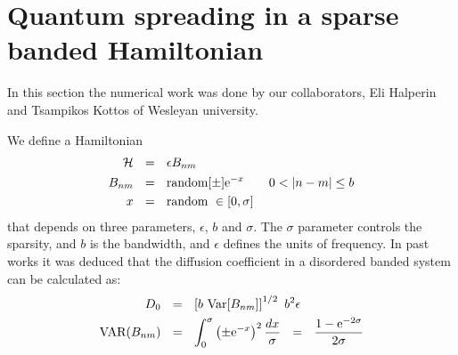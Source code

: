 {\begin{comment}
           In (\subref{fig:PN_kottos_pinning}) and (\subref{fig:ev_dist})
           we see the effects of diagonal disorder (pinning)
           on the spectrum. We see clearly that the lowest eigenvalues 
           are affected, and their corresponding PN is much lower. The spectrum
           reveals sub-diffusive behavior.
           In (\subref{fig:PN_g_scatter}) we compare the Thouless conductance
           $g$ with the participation number. 
           The presented points do seem to be correlated, but due to numerical issues,
           many values of $g$ are below the precision limit (seen as a vertical line in the plot), 
           up to $936$ from $1000$ for $\sigma=10$. 
           In (\subref{fig:spectral}) we compare $G_{DC\textrm{-spectral}}$ and $G_{DC\textrm{-Kirchoff}}$
           for a model with $b=10$ and $\sigma\in [0,80]$. They are correlated but unequal.
  }\label{fig:pta}
\end{figure}

\notbool{showfigure}{\end{comment}}{}





\section{Quantum spreading in a sparse banded Hamiltonian}\label{sec:dts}

In this section the numerical work was done by our collaborators,
Eli Halperin and Tsampikos Kottos of Wesleyan university.


We define a Hamiltonian
\begin{align}
\mathcal{H}\ \ &=\ \ \epsilon B_{nm}\\
B_{nm} \ \ &= \ \ \textrm{random}[\pm]\eexp{-x}\qquad 0<|n-m| \le b \\
x \ \ &= \ \ \textrm{random} \ \in [0,\sigma]
\end{align}
that depends on three parameters, $\epsilon$, $b$ and $\sigma$. The $\sigma$
parameter controls the sparsity, and $b$ is the bandwidth, and $\epsilon$
defines the units of frequency.
In past works \cite{cohen_wave_2000,stotland_random-matrix_2010} it was deduced that the diffusion coefficient 
in a disordered banded system can be calculated as:
\begin{align}
D_0 \ \ &=\ \ \left[b\ \textrm{Var}[B_{nm}]\right]^{1/2}\ b^2\epsilon \\
\textrm{VAR}(B_{nm}) \ \ &=\ \ \int_0^\sigma \left(\pm \eexp{-x}\right)^2 \frac{dx}{\sigma}\ \ 
 =\ \  \frac{1-\eexp{-2\sigma}}{2\sigma} 
\end{align}

